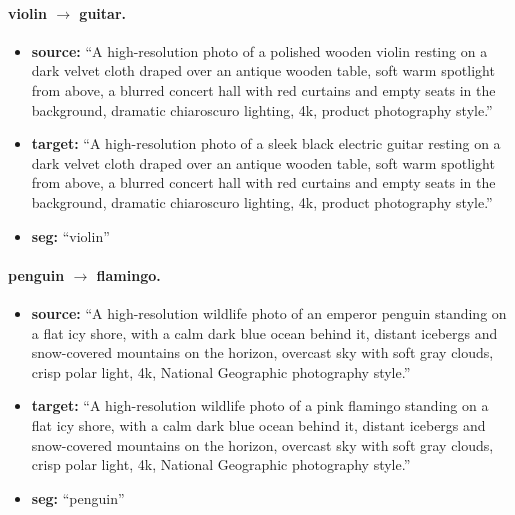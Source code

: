 \paragraph{violin $\to$ guitar.}
\begin{itemize}
    \item \textbf{source:} ``A high-resolution photo of a polished wooden violin resting on a dark velvet cloth draped over an antique wooden table, soft warm spotlight from above, a blurred concert hall with red curtains and empty seats in the background, dramatic chiaroscuro lighting, 4k, product photography style.''
    \item \textbf{target:} ``A high-resolution photo of a sleek black electric guitar resting on a dark velvet cloth draped over an antique wooden table, soft warm spotlight from above, a blurred concert hall with red curtains and empty seats in the background, dramatic chiaroscuro lighting, 4k, product photography style.''
    \item \textbf{seg:} ``violin''
\end{itemize}

\paragraph{penguin $\to$ flamingo.}
\begin{itemize}
    \item \textbf{source:} ``A high-resolution wildlife photo of an emperor penguin standing on a flat icy shore, with a calm dark blue ocean behind it, distant icebergs and snow-covered mountains on the horizon, overcast sky with soft gray clouds, crisp polar light, 4k, National Geographic photography style.''
    \item \textbf{target:} ``A high-resolution wildlife photo of a pink flamingo standing on a flat icy shore, with a calm dark blue ocean behind it, distant icebergs and snow-covered mountains on the horizon, overcast sky with soft gray clouds, crisp polar light, 4k, National Geographic photography style.''
    \item \textbf{seg:} ``penguin''
\end{itemize}

